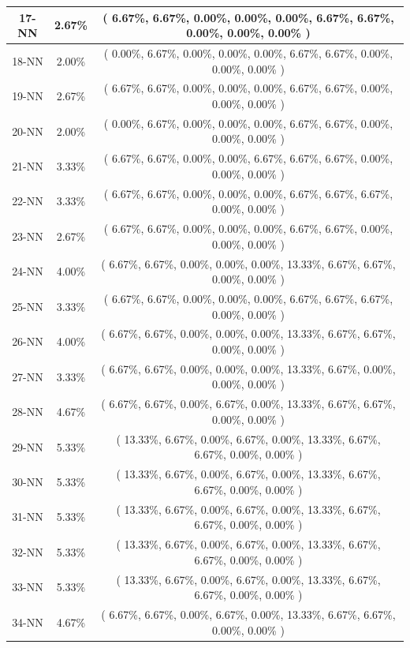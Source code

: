 \documentclass[11pt,a4paper]{article}
\begin{document}
\begin{center}
\begin{tabular} {|| c | c | c ||}
17-NN & 2.67\% & ( 6.67\%, 6.67\%, 0.00\%, 0.00\%, 0.00\%, 6.67\%, 6.67\%, 0.00\%, 0.00\%, 0.00\% )\\ \hline
18-NN & 2.00\% & ( 0.00\%, 6.67\%, 0.00\%, 0.00\%, 0.00\%, 6.67\%, 6.67\%, 0.00\%, 0.00\%, 0.00\% )\\ \hline
19-NN & 2.67\% & ( 6.67\%, 6.67\%, 0.00\%, 0.00\%, 0.00\%, 6.67\%, 6.67\%, 0.00\%, 0.00\%, 0.00\% )\\ \hline
20-NN & 2.00\% & ( 0.00\%, 6.67\%, 0.00\%, 0.00\%, 0.00\%, 6.67\%, 6.67\%, 0.00\%, 0.00\%, 0.00\% )\\ \hline
21-NN & 3.33\% & ( 6.67\%, 6.67\%, 0.00\%, 0.00\%, 6.67\%, 6.67\%, 6.67\%, 0.00\%, 0.00\%, 0.00\% )\\ \hline
22-NN & 3.33\% & ( 6.67\%, 6.67\%, 0.00\%, 0.00\%, 0.00\%, 6.67\%, 6.67\%, 6.67\%, 0.00\%, 0.00\% )\\ \hline
23-NN & 2.67\% & ( 6.67\%, 6.67\%, 0.00\%, 0.00\%, 0.00\%, 6.67\%, 6.67\%, 0.00\%, 0.00\%, 0.00\% )\\ \hline
24-NN & 4.00\% & ( 6.67\%, 6.67\%, 0.00\%, 0.00\%, 0.00\%, 13.33\%, 6.67\%, 6.67\%, 0.00\%, 0.00\% )\\ \hline
25-NN & 3.33\% & ( 6.67\%, 6.67\%, 0.00\%, 0.00\%, 0.00\%, 6.67\%, 6.67\%, 6.67\%, 0.00\%, 0.00\% )\\ \hline
26-NN & 4.00\% & ( 6.67\%, 6.67\%, 0.00\%, 0.00\%, 0.00\%, 13.33\%, 6.67\%, 6.67\%, 0.00\%, 0.00\% )\\ \hline
27-NN & 3.33\% & ( 6.67\%, 6.67\%, 0.00\%, 0.00\%, 0.00\%, 13.33\%, 6.67\%, 0.00\%, 0.00\%, 0.00\% )\\ \hline
28-NN & 4.67\% & ( 6.67\%, 6.67\%, 0.00\%, 6.67\%, 0.00\%, 13.33\%, 6.67\%, 6.67\%, 0.00\%, 0.00\% )\\ \hline
29-NN & 5.33\% & ( 13.33\%, 6.67\%, 0.00\%, 6.67\%, 0.00\%, 13.33\%, 6.67\%, 6.67\%, 0.00\%, 0.00\% )\\ \hline
30-NN & 5.33\% & ( 13.33\%, 6.67\%, 0.00\%, 6.67\%, 0.00\%, 13.33\%, 6.67\%, 6.67\%, 0.00\%, 0.00\% )\\ \hline
31-NN & 5.33\% & ( 13.33\%, 6.67\%, 0.00\%, 6.67\%, 0.00\%, 13.33\%, 6.67\%, 6.67\%, 0.00\%, 0.00\% )\\ \hline
32-NN & 5.33\% & ( 13.33\%, 6.67\%, 0.00\%, 6.67\%, 0.00\%, 13.33\%, 6.67\%, 6.67\%, 0.00\%, 0.00\% )\\ \hline
33-NN & 5.33\% & ( 13.33\%, 6.67\%, 0.00\%, 6.67\%, 0.00\%, 13.33\%, 6.67\%, 6.67\%, 0.00\%, 0.00\% )\\ \hline
34-NN & 4.67\% & ( 6.67\%, 6.67\%, 0.00\%, 6.67\%, 0.00\%, 13.33\%, 6.67\%, 6.67\%, 0.00\%, 0.00\% )\\ \hline

\end{tabular}
\end{center}
\end{document}
